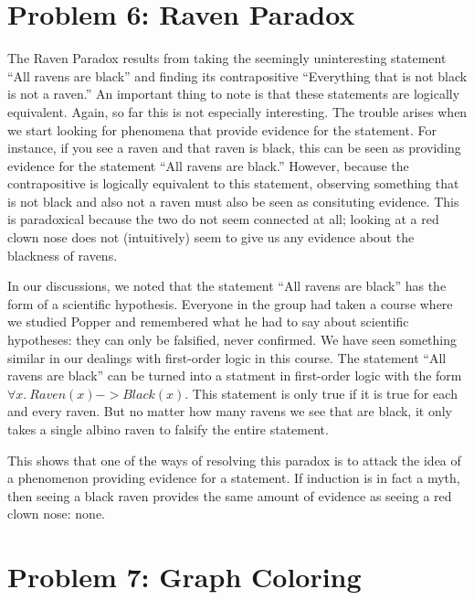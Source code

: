 \documentclass[10pt,letter]{article}
\begin{document}
\section*{Problem 6: Raven Paradox}
The Raven Paradox results from taking the seemingly uninteresting statement ``All ravens are black'' and finding its contrapositive ``Everything that is not black is not a raven.'' An important thing to note is that these statements are logically equivalent. Again, so far this is not especially interesting. The trouble arises when we start looking for phenomena that provide evidence for the statement. For instance, if you see a raven and that raven is black, this can be seen as providing evidence for the statement ``All ravens are black.'' However, because the contrapositive is logically equivalent to this statement, observing something that is not black and also not a raven must also be seen as consituting evidence. This is paradoxical because the two do not seem connected at all; looking at a red clown nose does not (intuitively) seem to give us any evidence about the blackness of ravens. 

In our discussions, we noted that the statement ``All ravens are black'' has the form of a scientific hypothesis. Everyone in the group had taken a course where we studied Popper and remembered what he had to say about scientific hypotheses: they can only be falsified, never confirmed. We have seen something similar in our dealings with first-order logic in this course. The statement ``All ravens are black'' can be turned into a statment in first-order logic with the form $\forall x .\ Raven(x) -> Black(x)$. This statement is only true if it is true for each and every raven. But no matter how many ravens we see that are black, it only takes a single albino raven to falsify the entire statement. 

This shows that one of the ways of resolving this paradox is to attack the idea of a phenomenon providing evidence for a statement. If induction is in fact a myth, then seeing a black raven provides the same amount of evidence as seeing a red clown nose: none. 

\section*{Problem 7: Graph Coloring}
\end{document}
